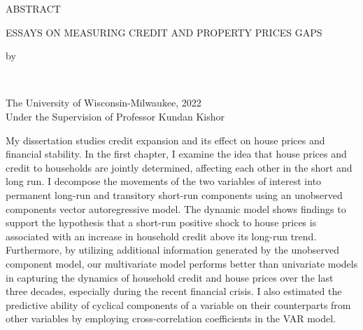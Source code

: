 
\begin{preliminary}

\maketitle
\newpage


\setcounter{page}{2}
\Large\begin{center}ABSTRACT\end{center}\normalsize

\begin{center}
	\singlespacing
\large ESSAYS ON MEASURING CREDIT AND PROPERTY PRICES GAPS
\end{center}

\doublespacing
\begin{center}
by\\
\end{center}

\begin{center}
\authorname\\
\end{center}

\singlespacing
\begin{center}
The University of Wisconsin-Milwaukee, 2022\\
Under the Supervision of Professor Kundan Kishor\\
\end{center}

\doublespacing
%

My dissertation studies credit expansion and its effect on house prices and financial stability. In the first chapter, I examine the idea that house prices and credit to households are jointly determined, affecting each other in the short and long run. I decompose the movements of the two variables of interest into permanent long-run and transitory short-run components using an unobserved components vector autoregressive model. The dynamic model shows findings to support the hypothesis that a short-run positive shock to house prices is associated with an increase in household credit above its long-run trend. Furthermore, by utilizing additional information generated by the unobserved component model, our multivariate model performs better than univariate models in capturing the dynamics of household credit and house prices over the last three decades, especially during the recent financial crisis. I also estimated the predictive ability of cyclical components of a variable on their counterparts from other variables by employing cross-correlation coefficients in the VAR model.


\end{preliminary}
